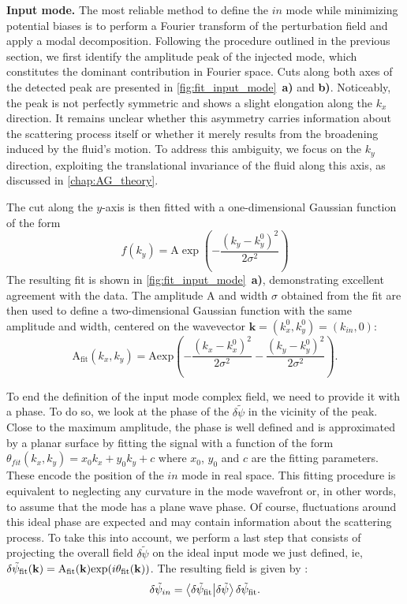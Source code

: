 \textbf{Input mode.} The most reliable method to define the $in$ mode while minimizing potential biases is to perform a Fourier transform of the perturbation field and apply a modal decomposition.
 Following the procedure outlined in the previous section, we first identify the amplitude peak of the injected mode, which constitutes the dominant contribution in Fourier space. 
 Cuts along both axes of the detected peak are presented in \autoref{fig:fit_input_mode}~\textbf{a)} and \textbf{b)}.
Noticeably, the peak is not perfectly symmetric and shows a slight elongation along the \( k_x \) direction. 
It remains unclear whether this asymmetry carries information about the scattering process itself or whether it merely results from the broadening induced by the fluid's motion. 
To address this ambiguity, we focus on the \( k_y \) direction, exploiting the translational invariance of the fluid along this axis, as discussed in \autoref{chap:AG_theory}. 

The cut along the \( y \)-axis is then fitted with a one-dimensional Gaussian function of the form
\[
f(k_y) = \mathrm{A} \exp\left( -\frac{(k_y - k_y^0)^2}{2\sigma^2} \right)
\]
The resulting fit is shown in \autoref{fig:fit_input_mode}~\textbf{a)}, demonstrating excellent agreement with the data. The amplitude \( \mathrm{A} \) and width \( \sigma \) obtained from the fit are then used to define a two-dimensional Gaussian function with the same amplitude and width, centered on the wavevector \( \mathbf{k}=(k_x^0,k_y^0)=(k_{in},0)\):
\begin{equation}
    \mathrm{A_{fit}}(k_x,k_y) = \mathrm{A} \mathrm{exp}(-\frac{(k_x-k_x^0)^2}{2\sigma^2}-\frac{(k_y-k_y^0)^2}{2\sigma^2}).
    \label{eq:gaussian_amp} 
\end{equation}

To end the definition of the input mode complex field, we need to provide it with a phase. To do so, we look at the phase of the $\delta \tilde{\psi}$ 
in the vicinity of the peak. Close to the maximum amplitude, the phase is well defined and is approximated by a planar surface by fitting the signal with a function of the form $\theta_{fit}(k_x, k_y)=x_0k_x+y_0k_y+c$ where $x_0$, $y_0$ and $c$ are the fitting parameters.
These encode the position of the $in$ mode in real space.
This fitting procedure is equivalent to neglecting any curvature in the mode wavefront or, in other words, to assume that the mode has a plane wave phase.
Of course, fluctuations around this ideal phase are expected and may contain information about the scattering process.
To take this into account, we perform a last step that consists of projecting the overall field $\delta \tilde{\psi}$ on the ideal input mode we just defined, ie, $\delta \tilde{\psi}_{\mathrm{fit}}(\mathbf{k})= \mathrm{A_{fit}}(\mathbf{k})\mathrm{exp}(i\theta_{\mathrm{fit}}(\mathbf{k}))$.
The resulting field is given by :
\begin{equation}
    \delta \tilde{\psi}_{in} = \bra{\delta \tilde{\psi}_{\mathrm{fit}}}\ket{\delta \tilde{\psi}} \delta \tilde{\psi}_{\mathrm{fit}}. 
    \label{eq:input_mode_scalar_product}
\end{equation}

